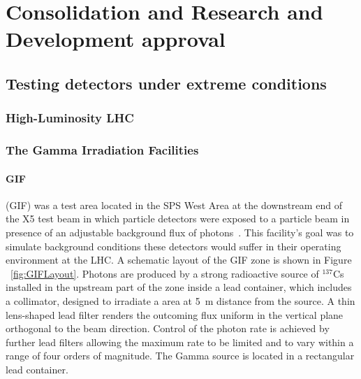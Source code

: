 \graphicspath{{chapt_dutch/}{intro/}{chapt2/}{chapt3/}{chapt4/}{chapt5/}{chapt6/}{chapt7/}{chapt8/}}

\renewcommand\evenpagerightmark{{\scshape\small Chapter 6}}
\renewcommand\oddpageleftmark{{\scshape\small Consolidation and Research and Development approval}}

\hyphenation{}

\chapter[Consolidation and Research and Development approval]%
{Consolidation and Research and Development approval}
\label{chapt:6}

\section{Testing detectors under extreme conditions}
\label{sec:extreme}

	\subsection{High-Luminosity LHC}
	\label{ssec:HL-LHC}

	\subsection{The Gamma Irradiation Facilities}
	\label{ssec:Facilities}
		\subsubsection{GIF}
		\label{sssec:GIF}
		
			(GIF) was a test area located in the SPS West Area at the downstream end of the X5 test beam in which particle detectors were exposed to a particle beam in presence of an adjustable background flux of photons~\cite{GIFacility}. This facility's goal was to simulate background conditions these detectors would suffer in their operating environment at the LHC. A schematic layout of the GIF zone is shown in Figure ~\ref{fig:GIFLayout}. Photons are produced by a strong radioactive source of $^{137}$Cs installed in the upstream part of the zone inside a lead container, which includes a collimator, designed to irradiate a  area at \SI{5}{\meter} distance from the source. A thin lens-shaped lead filter renders the outcoming flux uniform in the vertical plane orthogonal to the beam direction. Control of the photon rate is achieved by further lead filters allowing the maximum rate to be limited and to vary within a range of four orders of magnitude. The Gamma source is located in a rectangular lead container.
	
